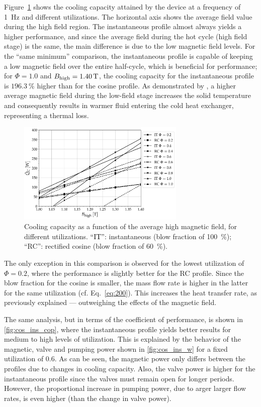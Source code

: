 \documentclass[referee]{svjour3}
\begin{document}
Figure~\ref{fig:cos_ins} shows the cooling capacity attained by the device at a frequency of \SI{1}{\hertz} and different utilizations. The horizontal axis shows the average field value during the high field region. The instantaneous profile almost always yields a higher performance, and since the average field during the hot cycle (high field stage) is the same, the main difference is due to the low magnetic field levels. For the ``same minimum'' comparison, the instantaneous profile is capable of keeping a low magnetic field over the entire half-cycle, which is beneficial for performance;  for $\Phi=1.0$ and $B_{\mathrm{high}} = \SI{1.40}{\tesla}$, the cooling capacity for the instantaneous profile is $\SI{196.3}{\percent}$ higher than for the cosine profile.  As demonstrated by \cite{bib:asme-mce}, a higher average magnetic field during the low-field stage increases the solid temperature and consequently results in  warmer fluid entering the cold heat exchanger, representing a thermal loss. 


\begin{figure}[!ht]
  \centering
\includegraphics[width=8cm]{Qc_B_comp_f_1_same_minimum}
  \caption{Cooling capacity as a function of the  average high magnetic field, for different utilizations. \textcolor{black}{``IT''}: instantaneous (blow fraction of \SI{100}{\percent}); ``RC'': rectified cosine  (blow fraction of \SI{60}{\percent}).}
 \label{fig:cos_ins}
\end{figure}

The only exception in this comparison is observed for the lowest utilization of $\Phi = 0.2$, where the performance is slightly better for the RC profile. Since the blow fraction for the cosine is smaller, the mass flow rate is higher in the latter for the same utilization (cf. Eq.~\eqref{eq:200}). This increases the heat transfer rate, as previously explained ---  outweighing the effects of the magnetic field.



The same analysis, but in terms of the coefficient of performance, is shown in \autoref{fig:cos_ins_cop}, where  the instantaneous profile yields better results for medium to high levels of utilization. This is explained by the behavior of the magnetic, valve and pumping power shown in   \autoref{fig:cos_ins_w} for a fixed utilization of 0.6. As can be seen, the magnetic power only differs between the profiles due to changes in cooling capacity. Also, the valve power is higher for the instantaneous profile since the valves must remain open for longer periods. However, the proportional increase in pumping power, due to arger larger flow rates, is even higher (than the change in valve power).
\end{document}
